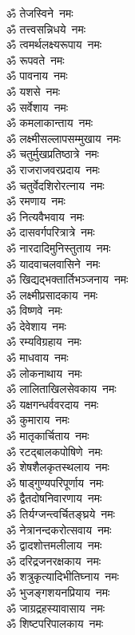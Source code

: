 \begin{multicols}{2}
\begin{flushleft}
        ॐ तेजस्विने~नमः\\
        ॐ तत्त्वसन्निधये~नमः\\
        ॐ त्वमर्थलक्ष्यरूपाय~नमः\\
        ॐ रूपवते~नमः\\
        ॐ पावनाय~नमः\\
        ॐ यशसे~नमः\\
        ॐ सर्वेशाय~नमः\\
        ॐ कमलाकान्ताय~नमः\\
        ॐ लक्ष्मीसल्लापसम्मुखाय~नमः\\
        ॐ चतुर्मुखप्रतिष्ठात्रे~नमः\hfill{}\\
                                                        
        ॐ राजराजवरप्रदाय~नमः\\
        ॐ चतुर्वेदशिरोरत्नाय~नमः\\
        ॐ रमणाय~नमः\\
        ॐ नित्यवैभवाय~नमः\\
        ॐ दासवर्गपरित्रात्रे~नमः\\
        ॐ नारदादिमुनिस्तुताय~नमः\\
        ॐ यादवाचलवासिने~नमः\\
        ॐ खिद्यद्भक्तार्तिभञ्जनाय~नमः\\
        ॐ लक्ष्मीप्रसादकाय~नमः\\
        ॐ विष्णवे~नमः\hfill{}\\
                                                        
        ॐ देवेशाय~नमः\\
        ॐ रम्यविग्रहाय~नमः\\
        ॐ माधवाय~नमः\\
        ॐ लोकनाथाय~नमः\\
        ॐ लालिताखिलसेवकाय~नमः\\
        ॐ यक्षगन्धर्ववरदाय~नमः\\
        ॐ कुमाराय~नमः\\
        ॐ मातृकार्चिताय~नमः\\
        ॐ रटद्बालकपोषिणे~नमः\\
        ॐ शेषशैलकृतस्थलाय~नमः\hfill{}\\
                                                        
        ॐ षाड्गुण्यपरिपूर्णाय~नमः\\
        ॐ द्वैतदोषनिवारणाय~नमः\\
        ॐ तिर्यग्जन्त्वर्चितङ्घ्रये~नमः\\
        ॐ नेत्रानन्दकरोत्सवाय~नमः\\
        ॐ द्वादशोत्तमलीलाय~नमः\\
        ॐ दरिद्रजनरक्षकाय~नमः\\
        ॐ शत्रुकृत्यादिभीतिघ्नाय~नमः\\
        ॐ भुजङ्गशयनप्रियाय~नमः\\
        ॐ जाग्रद्रहस्यावासाय~नमः\\
        ॐ शिष्टपरिपालकाय~नमः\hfill{}\\
                                                        

\end{flushleft}
\end{multicols}
